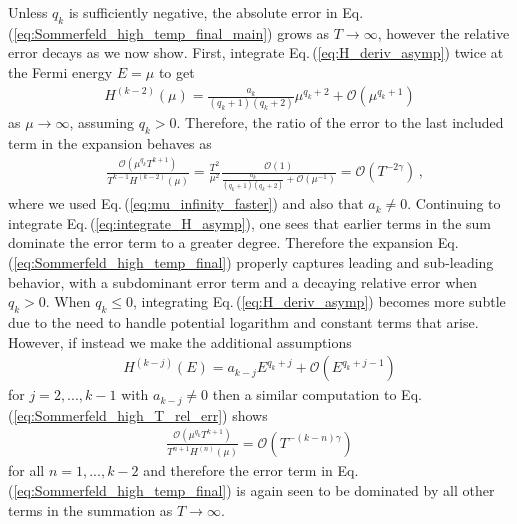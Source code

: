 \documentclass[sn-mathphys,Numbered]{sn-jnl}
\newcommand{\req}[1]{Eq.\,(\ref{#1})}
\begin{document}
Unless $q_k$ is sufficiently negative, the absolute error in \req{eq:Sommerfeld_high_temp_final_main} grows as $T\to\infty$, however the relative error decays as we now show. First, integrate \req{eq:H_deriv_asymp} twice at the Fermi energy $E=\mu$ to get
\begin{align}\label{eq:integrate_H_asymp}
 H^{(k-2)}(\mu)=\frac{a_k}{(q_k+1)(q_k+2)}\mu^{q_k+2}+\mathcal{O}(\mu^{q_k+1})
\end{align}
as $\mu\to\infty$, assuming $q_k>0$. Therefore, the ratio of the error to the last included term in the expansion behaves as
\begin{align}\label{eq:Sommerfeld_high_T_rel_err}
&\frac{\mathcal{O}(\mu^{q_k}T^{k+1})}{ T^{k-1} H^{(k-2)}(\mu)}=\frac{T^2}{\mu^2}\frac{\mathcal{O}(1)}{ \frac{a_k}{(q_k+1)(q_k+2)}+\mathcal{O}(\mu^{-1})}= \mathcal{O}(T^{-2\gamma})\,,
\end{align}
where we used \req{eq:mu_infinity_faster} and also that $a_k\neq 0$. Continuing to integrate \req{eq:integrate_H_asymp}, one sees that earlier terms in the sum dominate the error term to a greater degree. Therefore the expansion \req{eq:Sommerfeld_high_temp_final} properly captures leading and sub-leading behavior, with a subdominant error term and a decaying relative error when $q_k>0$. When $q_k\leq 0$, integrating \req{eq:H_deriv_asymp} becomes more subtle due to the need to handle potential logarithm and constant terms that arise. However, if instead we make the additional assumptions 
\begin{align}
H^{(k-j)}(E)=a_{k-j} E^{q_k+j} +\mathcal{O}(E^{q_k+j-1})
\end{align}
for $j=2,...,k-1$ with $a_{k-j}\neq 0$ then a similar computation to \req{eq:Sommerfeld_high_T_rel_err} shows
\begin{align}
 \frac{\mathcal{O}(\mu^{q_k}T^{k+1})}{T^{n+1}H^{(n)}(\mu)}= \mathcal{O}(T^{-(k-n)\gamma})
\end{align}
for all $n=1,...,k-2$ and therefore the error term in \req{eq:Sommerfeld_high_temp_final} is again seen to be dominated by all other terms in the summation as $T\to\infty$. 
\end{document}
